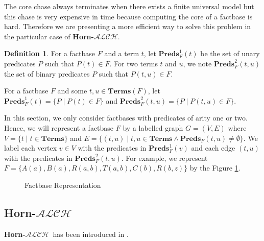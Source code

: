 \documentclass{article}
\theoremstyle{definition}
\newtheorem{definition}{Definition}[section]
\theoremstyle{remark}
\newcommand{\Terms}{\textbf{Terms}}
\newcommand{\Preds}{\textbf{Preds}}
\newcommand{\ALCH}{\textbf{Horn-$\mathcal{ALCH}$}}
\begin{document}
The core chase always terminates when there exists a finite universal model but this chase is very expensive in time because computing the core of a factbase is hard. Therefore we are presenting a more efficient way to solve this problem in the particular case of \ALCH.

\begin{definition}
For a factbase $F$ and a term $t$, let \emph{$\Preds^1_F(t)$} be the set of unary predicates $P$ such that $P(t)\in F$. For two terms $t$ and $u$, we note \emph{$\Preds^2_F(t,u)$} the set of binary predicates $P$ such that $P(t,u)\in F$. 

For a factbase $F$ and some $t, u \in \Terms(F)$, let $\Preds^1_F(t) = \{P \mid P(t) \in F\}$ and $\Preds^2_F(t, u) = \{P \mid P(t, u) \in F\}$.
\end{definition}

In this section, we only consider factbases with predicates of arity one or two. Hence, we will represent a factbase $F$ by a labelled graph $G = (V,E)$ where $V = \{t \mid t \in \Terms \}$ and $E = \{(t,u) \mid t,u \in \Terms \wedge \Preds_F(t,u) \neq \emptyset\}$. We label each vertex $v \in V$ with the predicates in $\Preds_F^1(v)$ and each edge $(t, u)$ with the predicates in $\Preds^2_F(t, u)$. For example, we represent $F = \{A(a), B(a),R(a,b),T(a,b),C(b),R(b,z)\}$ by the Figure \ref{figure:graph}.

\begin{figure}
\label{figure:graph}
\caption{Factbase Representation}
\end{figure}

\subsection{\ALCH }

\ALCH\ has been introduced in \cite{Horn-ALC}.
\end{document}
